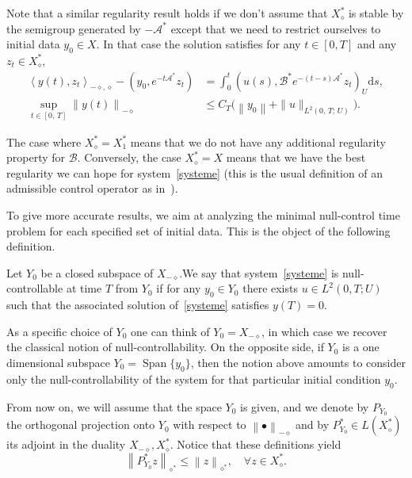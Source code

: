 \documentclass[AHL,Unicode,longabstracts]{cedram}
\newcommand\As{\mathcal{A}^*}
\newcommand\B{\mathcal{B}}
\newcommand\Bs{\mathcal{B}^*}
\newcommand{\Xuns}{X_1^*}
\newcommand{\Xalphas}{X_\diamond^*}
\newcommand{\Xmalpha}{X_{-\diamond}}
\newcommand{\Fzp}{Y_0}
\newcommand{\normeX}[1]{\left\| #1 \right\|}
\newcommand{\normeXalphas}[1]{\left\| #1 \right\|_{\diamond^*}}
\newcommand{\normeXmalpha}[1]{\left\| #1 \right\|_{-\diamond}}
\newcommand{\psX}[2]{\left(#1, #2 \right)}
\newcommand{\psU}[2]{\left(#1, #2 \right)_U}
\newcommand{\dual}[2]{\left\langle #1, #2 \right\rangle_{-\diamond,\diamond}}
\newcommand{\PF}{P_{\Fzp}}
\newcommand{\PFa}{P_{\Fzp}^*}
\newcommand{\md}{\mathrm{d}}
\DeclareMathOperator{\Span}{Span}
\renewcommand{\cdot}{{\scriptstyle \bullet}}
\let\oldforall\forall
\renewcommand*{\forall}{\mathrel{\oldforall}}
\begin{document}
\begin{rema}\label{Rem:Xdiamond_stable}
Note that a similar regularity result holds if we don't assume that $\Xalphas$ is stable by the semigroup generated by $-\As$ except that we need to restrict ourselves to initial data $y_0\in X$. In that case the solution satisfies for any $t \in [0,T]$ and any $z_t \in \Xalphas$,
\begin{align*}
\dual{y(t)}{z_t} - \psX{y_0}{e^{-t\As} z_t} &= \int_0^t \psU{u(s)}{ \Bs e^{-(t-s) \As} z_t} \md s,\\
\sup\limits_{t \in [0,\,T]} \normeXmalpha{y(t)} &\leq C_T \big(\normeX{y_0} + \| u \|_{L^2(0,\,T;\,U)} \big).
\end{align*}
\end{rema}

\begin{rema}
The case where $\Xalphas=\Xuns$ means that we do not have any additional regularity property for $\B$. Conversely, the case $\Xalphas=X$ means that we have the best regularity we can hope for system~\eqref{systeme} (this is the usual definition of an admissible control operator as in~\cite{CoronBook,TucsnakWeissBook}).
\end{rema}


To give more accurate results, we aim at analyzing the minimal null-control time problem for each specified set of initial data. This is the object of the following definition.

\begin{defi}
Let $\Fzp$ be a closed subspace of $\Xmalpha$.We say that system~\eqref{systeme} is null-controllable at time $T$ from $\Fzp$ if for any $y_0 \in \Fzp$ there exists $u \in L^2(0,T ; U)$ such that the associated solution of~\eqref{systeme} satisfies $y(T) = 0$.
\end{defi}

As a specific choice of $\Fzp$ one can think of $\Fzp = \Xmalpha$, in which case we recover the classical notion of null-controllability. On the opposite side, if $\Fzp$ is a one dimensional subspace $\Fzp = \Span\{ y_0 \}$, then the notion above amounts to consider only the null-controllability of the system for that particular initial condition $y_0$.


From now on, we will assume that the space $\Fzp$ is given, and we denote by $\PF$ the orthogonal projection onto $\Fzp$ with respect to $\normeXmalpha{\cdot}$ and by $\PFa\in L(\Xalphas)$ its adjoint in the duality $\Xmalpha, \Xalphas$. Notice that these definitions yield
\begin{equation}\label{PFa_norme_un}
\normeXalphas{\PFa z} \leq \normeXalphas{z}, \quad \forall z \in \Xalphas.
\end{equation}
\end{document}
